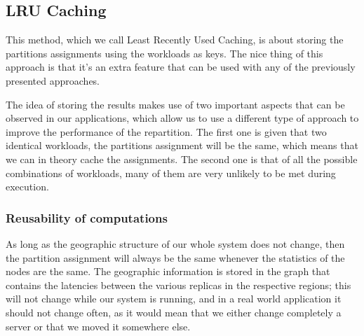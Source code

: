 
\subsection{LRU Caching}\label{sec:lru-caching}
This method, which we call Least Recently Used Caching, is about storing the partitions assignments using the workloads as keys. The nice thing of this approach is that it's an extra feature that can be used with any of the previously presented approaches.

The idea of storing the results makes use of two important aspects that can be observed in our applications, which allow us to use a different type of approach to improve the performance of the repartition. The first one is given that two identical workloads, the partitions assignment will be the same, which means that we can in theory cache the assignments. The second one is that of all the possible combinations of workloads, many of them are very unlikely to be met during execution.

\subsubsection{Reusability of computations}\label{sec:Reusability-of-computations}
As long as the geographic structure of our whole system does not change, then the partition assignment will always be the same whenever the statistics of the nodes are the same. The geographic information is stored in the graph that contains the latencies between the various replicas in the respective regions; this will not change while our system is running, and in a real world application it should not change often, as it would mean that we either change completely a server or that we moved it somewhere else.

